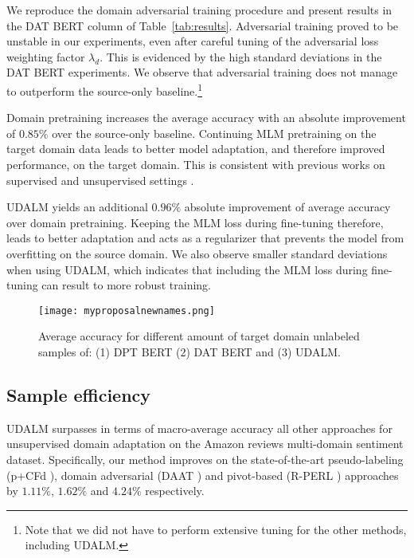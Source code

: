 \documentclass[11pt]{article}
\begin{document}
We reproduce the domain adversarial training procedure and present results in the DAT BERT column of Table~\ref{tab:results}. Adversarial training proved to be unstable in our experiments, even after careful tuning of the adversarial loss weighting factor \(\lambda_d\). This is evidenced by the high standard deviations in the DAT BERT experiments. We observe that adversarial training does not manage to outperform the source-only baseline.\footnote{Note that we did not have to perform extensive tuning for the other methods, including UDALM.}

Domain pretraining increases the average accuracy with an absolute improvement of \(0.85\%\) over the source-only baseline.
Continuing MLM pretraining on the target domain data leads to better model adaptation, and therefore improved performance, on the target domain.
This is consistent with previous works on supervised  \citep{gururangan-etal-2020-dont, xu-etal-2019-bert, sun2019fine} and unsupervised settings \citep{han-eisenstein-2019-unsupervised, du-etal-2020-adversarial}. 

UDALM yields an additional \(0.96\%\) absolute improvement of average accuracy over domain pretraining. Keeping the MLM loss during fine-tuning therefore, leads to better adaptation and acts as a regularizer that prevents the model from overfitting on the source domain. We also observe smaller standard deviations when using UDALM, which indicates that including the MLM loss during fine-tuning can result to more robust training.

\begin{figure*}[t]
\centering
\texttt{[image: myproposalnewnames.png]}
\caption{Average accuracy for different amount of target domain unlabeled samples of: (1) DPT BERT (2) DAT BERT and (3) UDALM.}
\label{fig:efic}
\end{figure*}
\subsection{Sample efficiency}
\label{sec:sample-eff}

UDALM surpasses in terms of macro-average accuracy all other approaches for unsupervised domain adaptation on the Amazon reviews multi-domain sentiment dataset.
Specifically, our method improves on the state-of-the-art pseudo-labeling (p+CFd \citealp{ye_feature_2020}), domain adversarial (DAAT \citealp{du-etal-2020-adversarial}) and pivot-based (R-PERL \citealp{ben2020perl}) approaches by \(1.11\%\), \(1.62\%\) and \(4.24\%\) respectively.
\end{document}
